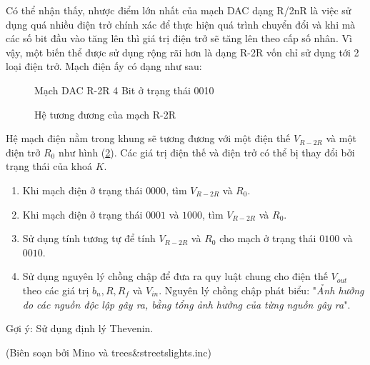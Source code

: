 \begin{center}
\begin{enumerate}[label=(\alph*)]
    Có thể nhận thấy, nhược điểm lớn nhất của mạch DAC dạng R/2nR là việc sử dụng quá nhiều điện trở chính xác để thực hiện quá trình chuyển đổi và khi mà các số bit đầu vào tăng lên thì giá trị điện trở sẽ tăng lên theo cấp số nhân. Vì vậy, một biến thể được sử dụng rộng rãi hơn là dạng R-2R vốn chỉ sử dụng tới 2 loại điện trở. Mạch điện ấy có dạng như sau:
    \begin{figure}[H]
        
        \caption{Mạch DAC R-2R 4 Bit ở trạng thái 0010}
        \label{fig:64}
    \end{figure} 
    \begin{figure}[H]
        \centering
        
        \caption{Hệ tương đương của mạch R-2R}
        \label{fig:65}
    \end{figure}

Hệ mạch điện nằm trong khung sẽ tương đương với một điện thế $V_{R-2R}$ và một điện trở $R_0$ như hình (\ref{fig:65}). Các giá trị điện thế và điện trở có thể bị thay đổi bởi trạng thái của khoá $K$.
\begin{enumerate}
    \item[1.] Khi mạch điện ở trạng thái $0000$, tìm $V_{R-2R}$ và $R_0$.
    \item[2.] Khi mạch điện ở trạng thái $0001$ và $1000$, tìm $V_{R-2R}$ và $R_0$. 
    \item[3.] Sử dụng tính tương tự để tính $V_{R-2R}$ và $R_0$ cho mạch ở trạng thái $0100$ và $0010$.
    \item[4.] Sử dụng nguyên lý chồng chập để đưa ra quy luật chung cho điện thế $V_{out}$ theo các giá trị $b_n, R, R_f$ và $V_{in}$. Nguyên lý chồng chập phát biểu: "\textit{Ảnh hưởng do các nguồn độc lập gây ra, bằng tổng ảnh hưởng của từng nguồn gây ra}".
\end{enumerate}

Gợi ý: Sử dụng định lý Thevenin.
\end{enumerate}
\end{center}
\begin{flushright}
   \normalcolor(Biên soạn bởi Mino và trees\&streetslights.inc)
\end{flushright}